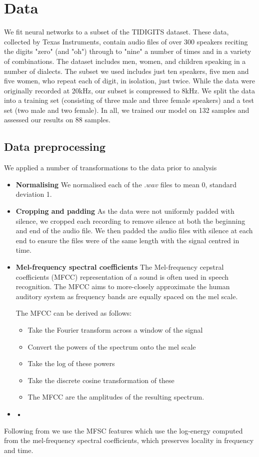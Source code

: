 \documentclass{article} %
\begin{document}
\section{Data}
We fit neural networks to a subset of the TIDIGITS dataset. These data, collected by Texas Instruments, contain audio files of over 300 speakers reciting the digits "zero" (and "oh") through to "nine" a number of times and in a variety of combinations. The dataset includes men, women, and children speaking in a number of dialects. The subset we used includes just ten speakers, five men and five women, who repeat each of digit, in isolation, just twice. While the data were originally recorded at 20kHz, our subset is compressed to 8kHz.
We split the data into a training set (consisting of three male and three female speakers) and a test set (two male and two female). In all, we trained our model on 132 samples and assessed our results on 88 samples.

 

\subsection{Data preprocessing}
We applied a number of transformations to the data prior to analysis
\begin{itemize}
\item \textbf{Normalising} We normalised each of the $.wav$ files to mean 0, standard deviation 1.

\item \textbf{Cropping and padding} As the data were not uniformly padded with silence, we cropped each recording to remove silence at both the beginning and end of the audio file. We then padded the audio files with silence at each end to ensure the files were of the same length with the signal centred in time.

\item \textbf{Mel-frequency spectral coefficients}
The Mel-frequency cepstral coefficients (MFCC) representation of a sound is often used in speech recognition. The MFCC aims to more-closely approximate the human auditory system as frequency bands are equally spaced on the mel scale. 

The MFCC can be derived as follows:
\begin{itemize}
\item Take the Fourier transform across a window of the signal
\item Convert the powers of the spectrum onto the mel scale
\item Take the log of these powers
\item Take the discrete cosine transformation of these
\item The MFCC are the amplitudes of the resulting spectrum.
\end{itemize}
\item \textbf{•}
\end{itemize}

Following from \cite{abdel2014convolutional} we use the MFSC features which use the log-energy computed from the mel-frequency spectral coefficients, which preserves locality in frequency and time.




\end{document}
